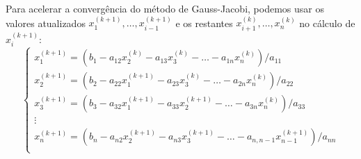 \documentclass[../numerical_methods.tex]{subfiles}
\begin{document}
Para acelerar a convergência do método de Gauss-Jacobi, podemos usar os valores atualizados \(x_{1}^{(k+1)}, \dotsc , x_{i-1}^{(k+1)}\) e os restantes \(x_{i+1}^{(k)}, \dotsc , x_{n}^{(k)}\) no cálculo de \(x_{i}^{(k+1)}\):
\[
	\left\{\begin{array}{ll}
		x_1^{(k+1)} = (b_1-a_{12}x_2^{(k)} - a_{13}x_3^{(k)} -\dotsc - a_{1n}     x_{n}^{(k)})/a_{11}        \\
		x_2^{(k+1)} = (b_2-a_{22}x_1^{(k+1)}- a_{23}x_3 ^{(k)}-\dotsc - a_{2n}      x_{n}^{(k)})/a_{22}      \\
		x_3^{(k+1)} = (b_3-a_{32}x_1^{(k+1)}- a_{33}x_2 ^{(k+1)}-\dotsc - a_{3n}      x_{n}^{(k)})/a_{33}    \\
		\vdots                                                                                               \\
		x_n^{(k+1)} = (b_n-a_{n2}x_2^{(k+1)} - a_{n3}x_3^{(k+1)} -\dotsc - a_{n, n-1}x_{n-1}^{(k+1)})/a_{nn} \\
	\end{array}\right.
\]
\end{document}

